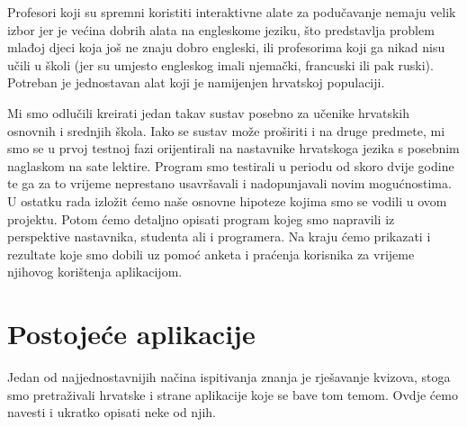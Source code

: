\documentclass[11pt]{scrreprt}
\begin{document}
Profesori koji su spremni koristiti interaktivne alate za podučavanje nemaju velik
izbor jer je većina dobrih alata na engleskome jeziku, što predstavlja problem
mlađoj djeci koja još ne znaju dobro engleski, ili profesorima koji ga nikad
nisu učili u školi (jer su umjesto engleskog imali njemački, francuski ili pak
ruski). Potreban je jednostavan alat koji je namijenjen hrvatskoj populaciji.

Mi smo odlučili kreirati jedan takav sustav posebno za učenike hrvatskih
osnovnih i srednjih škola. Iako se sustav može proširiti i na druge predmete,
mi smo se u prvoj testnoj fazi orijentirali na nastavnike hrvatskoga jezika s
posebnim naglaskom na sate lektire. Program smo testirali u periodu od skoro
dvije godine te ga za to vrijeme neprestano usavršavali i nadopunjavali novim
mogućnostima. U ostatku rada izložit ćemo naše osnovne hipoteze kojima smo se
vodili u ovom projektu. Potom ćemo detaljno opisati program kojeg smo napravili
iz perspektive nastavnika, studenta ali i programera. Na kraju ćemo prikazati i
rezultate koje smo dobili uz pomoć anketa i praćenja korisnika za vrijeme
njihovog korištenja aplikacijom.

\section*{Postojeće aplikacije}

Jedan od najjednostavnijih načina ispitivanja znanja je rješavanje kvizova,
stoga smo pretraživali hrvatske i strane aplikacije koje se bave tom temom.
Ovdje ćemo navesti i ukratko opisati neke od njih.
\end{document}
